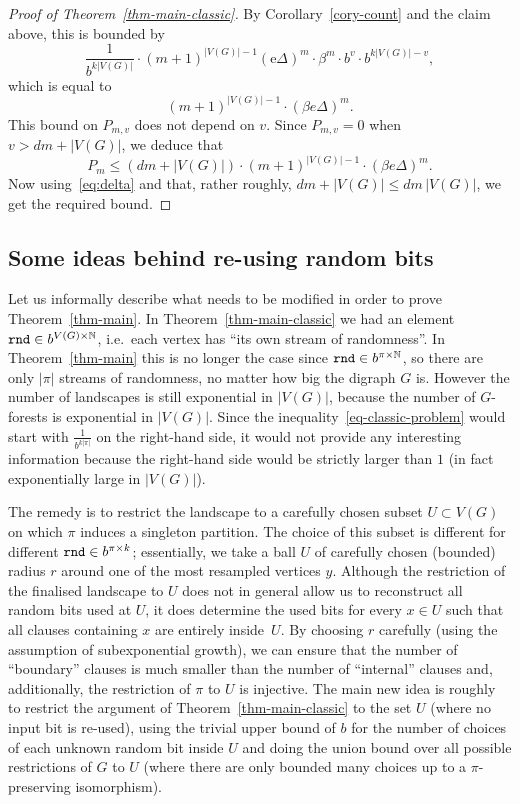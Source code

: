 \documentclass[12pt,a4paper]{article}
\numberwithin{equation}{section}
\theoremstyle{definition}
\newcommand{\be}{{\beta}}
\newcommand{\De}{{\Delta}}
\renewcommand{\le}{\leqslant}
\newcommand\NN{\mathbb N}
\newcommand{\me}{\mathrm{e}}
\begin{document}
\begin{proof}[Proof of Theorem~\ref{thm-main-classic}]
    By Corollary~\ref{cory-count} and the claim above,  this is bounded by 
    $$
      \frac{1}{b^{k|V(G)|}}\cdot (m+1)^{|V(G)|-1}(\me\De)^m  \cdot \beta^m \cdot b^{v} \cdot b^{k|V(G)|- v},
    $$
    which is equal to
    $$
    (m+1)^{|V(G)|-1} \cdot (\be e \De)^m.
    $$
    This bound on $P_{m,v}$ does not depend on $v$. Since $P_{m,v}=0$ when $v>dm+|V(G)|$, we deduce that 
    $$
    P_m \le (dm+|V(G)|)\cdot (m+1)^{|V(G)|-1} \cdot (\be e \De)^m.
    $$
    Now using~\eqref{eq:delta} and that, rather roughly, $dm+|V(G)|\le dm\,|V(G)|$, we get the required bound.
    \end{proof}
    

\subsection{Some ideas behind re-using random bits}
    
    Let us informally describe what needs to be modified in order to prove Theorem~\ref{thm-main}. In Theorem~\ref{thm-main-classic} we had an element $\rnd\in b^{V(G)\times \NN}$, i.e.~each vertex has ``its own stream of randomness''. In Theorem~\ref{thm-main} this is no longer the case since $\rnd\in b^{\pi\times \NN}$, so there are only $|\pi|$  streams of randomness, no matter how big the digraph $G$ is. However the number of landscapes is still exponential in $|V(G)|$, because the number of $G$-forests is exponential in $|V(G)|$.  Since the inequality~\eqref{eq-classic-problem} would start with $\frac{1}{b^{k|\pi|}}$ on the right-hand side, it would not provide any interesting information because the right-hand side would be strictly larger than $1$ (in fact exponentially large in $|V(G)|$).
    
    The remedy is to restrict the landscape to a carefully chosen  subset $U\subset V(G)$  on which $\pi$ induces a singleton partition. The choice of this subset is different for different $\normalfont{\texttt{rnd}}\in b^{\pi\times k}$; essentially, we take a ball $U$ of carefully chosen (bounded) radius $r$
    around one of the most resampled vertices $y$. Although the restriction of the finalised landscape to $U$ does not in general allow us to reconstruct all random bits used at $U$, it does determine the used bits for every $x\in U$ such that all clauses containing $x$ are entirely inside~$U$.    
    By choosing $r$ carefully (using the assumption of subexponential growth), we can ensure that the number of ``boundary'' clauses is much smaller than the number of ``internal'' clauses and, additionally,  the restriction of $\pi$ to $U$ is injective. The main new idea is roughly to restrict the argument of Theorem~\ref{thm-main-classic} to the set $U$ (where no input bit is re-used), using the trivial upper bound of $b$ for the number of choices of each unknown random bit inside $U$ and doing the union bound over all possible restrictions of $G$ to $U$ (where there are only bounded many choices up to a $\pi$-preserving isomorphism).
    
\end{document}
